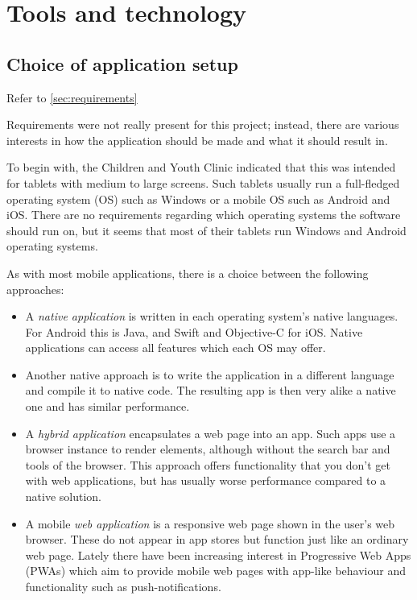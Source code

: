 \chapter{Tools and technology}
\label{ch:tools}

\section{Choice of application setup}

Refer to \ref{sec:requirements}

Requirements were not really present for this project; instead, there are various interests in how the application should be made and what it should result in.

To begin with, the Children and Youth Clinic indicated that this was intended for tablets with medium to large screens. Such tablets usually run a full-fledged operating system (OS) such as Windows or a mobile OS such as Android and iOS. There are no requirements regarding which operating systems the software should run on, but it seems that most of their tablets run Windows and Android operating systems.

As with most mobile applications, there is a choice between the following approaches:

\begin{itemize}
    \item A \emph{native application} is written in each operating system's native languages. For Android this is Java, and Swift and Objective-C for iOS. Native applications can access all features which each OS may offer.
    \item Another native approach is to write the application in a different language and compile it to native code. The resulting app is then very alike a native one and has similar performance.
    \item A \emph{hybrid application} encapsulates a web page into an app. Such apps use a browser instance to render elements, although without the search bar and tools of the browser. This approach offers functionality that you don't get with web applications, but has usually worse performance compared to a native solution.
    \item A mobile \emph{web application} is a responsive web page shown in the user's web browser. These do not appear in app stores but function just like an ordinary web page. Lately there have been increasing interest in Progressive Web Apps (PWAs) which aim to provide mobile web pages with app-like behaviour and functionality such as push-notifications.
\end{itemize}

